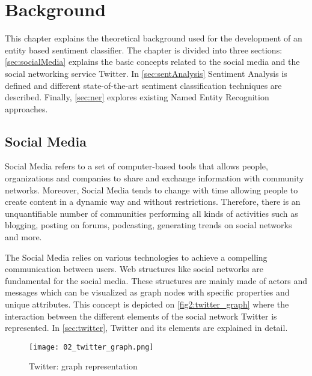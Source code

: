  
 
 \chapter{Background}
 \label{sec:background}
 
 
 This chapter explains the theoretical background used for the development of an entity based sentiment classifier. The chapter is divided into three sections: \autoref{sec:socialMedia} explains the basic concepts related to the social media and the social networking service Twitter. In \autoref{sec:sentAnalysis} Sentiment Analysis is defined and different state-of-the-art sentiment classification techniques are described. Finally, \autoref{sec:ner} explores existing Named Entity Recognition approaches.
 
 \section{Social Media}
 \label{sec:socialMedia}
 
Social Media refers to a set of computer-based tools that allows people, organizations and companies to share and exchange information with community networks. Moreover, Social Media tends to change with time allowing people to create content in a dynamic way and without restrictions. Therefore, there is an unquantifiable number of communities performing all kinds of activities such as blogging, posting on forums, podcasting, generating trends on social networks and more. 

The Social Media relies on various technologies to achieve a compelling communication between users. Web structures like social networks are fundamental for the social media. These structures are mainly made of actors and messages which can be visualized as graph nodes with specific properties and unique attributes. This concept is depicted on \autoref{fig2:twitter_graph} where the interaction between the different elements of the social network Twitter is represented. In \autoref{sec:twitter}, Twitter and its elements are explained in detail.

\begin{figure}
    \centering
    \caption[Twitter graph representation]{Twitter: graph representation {~\cite{kenny2014graph}}}
    \texttt{[image: 02\_twitter\_graph.png]}
    \label{fig2:twitter_graph}
\end{figure}

